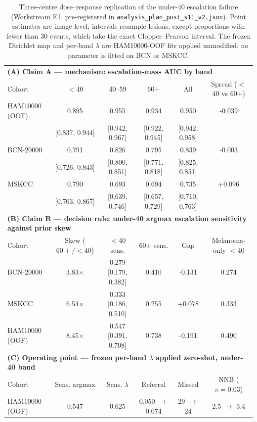 \begin{table}[t]
\centering
\caption{Three-centre dose--response replication of the under-40 escalation failure (Workstream E1, pre-registered in \texttt{analysis\_plan\_post\_s11\_v2.json}). Point estimates are image-level; intervals resample lesions, except proportions with fewer than 30 events, which take the exact Clopper--Pearson interval. The frozen Dirichlet map and per-band $\lambda$ are HAM10000-OOF fits applied unmodified: no parameter is fitted on BCN or MSKCC.}
\label{tab:external_age_replication}
\footnotesize
\begin{tabular}{lccccc}
\toprule
\multicolumn{6}{l}{\textbf{(A) Claim A --- mechanism: escalation-mass AUC by band}} \\
Cohort & $<$40 & 40--59 & 60+ & All & Spread ($<$40 vs 60+) \\
\midrule
HAM10000 (OOF) & 0.895 & 0.955 & 0.934 & 0.950 & -0.039 \\
 & [0.837, 0.944] & [0.942, 0.967] & [0.922, 0.945] & [0.942, 0.958] & \\
BCN-20000 & 0.791 & 0.826 & 0.795 & 0.839 & -0.003 \\
 & [0.726, 0.843] & [0.800, 0.851] & [0.771, 0.818] & [0.825, 0.851] & \\
MSKCC & 0.790 & 0.693 & 0.694 & 0.735 & +0.096 \\
 & [0.703, 0.867] & [0.639, 0.746] & [0.657, 0.729] & [0.710, 0.763] & \\
\midrule
\multicolumn{6}{l}{\textbf{(B) Claim B --- decision rule: under-40 argmax escalation sensitivity against prior skew}} \\
Cohort & Skew ($60{+}/{<}40$) & $<$40 sens. & 60+ sens. & Gap & Melanoma-only $<$40 \\
\midrule
BCN-20000 & 3.83$\times$ & 0.279 [0.179, 0.382] & 0.410 & -0.131 & 0.274 \\
MSKCC & 6.54$\times$ & 0.333 [0.186, 0.510] & 0.255 & +0.078 & 0.333 \\
HAM10000 (OOF) & 8.45$\times$ & 0.547 [0.391, 0.708] & 0.738 & -0.191 & 0.490 \\
\midrule
\multicolumn{6}{l}{\textbf{(C) Operating point --- frozen per-band $\lambda$ applied zero-shot, under-40 band}} \\
Cohort & Sens. argmax & Sens. $\lambda$ & Referral & Missed & NNB ($\pi=0.03$) \\
\midrule
HAM10000 (OOF) & 0.547 & 0.625 & 0.050 $\rightarrow$ 0.074 & 29 $\rightarrow$ 24 & 2.5 $\rightarrow$ 3.4 \\

\end{tabular}
\end{table}
